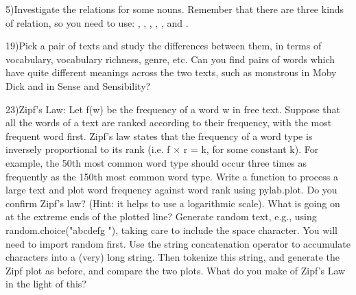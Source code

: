\documentclass[12pt]{article}
\begin{document}
	5)Investigate the  relations for some nouns. Remember that there are three kinds of  relation, so you need to use: , , 
	, , , and .
	
	19)Pick a pair of texts and study the differences between them, in terms of vocabulary, vocabulary richness, genre, etc. Can you find pairs of words which have quite different meanings across the two texts, such as monstrous in Moby Dick and in Sense and Sensibility?
	
	23)Zipf's Law: Let f(w) be the frequency of a word w in free text. Suppose that all the words of a text are ranked according to their frequency, with the most frequent word first. Zipf's law states that the frequency of a word type is inversely proportional to its rank (i.e. f × r = k, for some constant k). For example, the 50th most common word type should occur three times as frequently as the 150th most common word type.
	Write a function to process a large text and plot word frequency against word rank using pylab.plot. Do you confirm Zipf's law? (Hint: it helps to use a logarithmic scale). What is going on at the extreme ends of the plotted line?
	Generate random text, e.g., using random.choice("abcdefg "), taking care to include the space character. You will need to import random first. Use the string concatenation operator to accumulate characters into a (very) long string. Then tokenize this string, and generate the Zipf plot as before, and compare the two plots. What do you make of Zipf's Law in the light of this?
\end{document}
